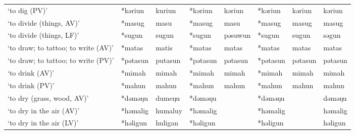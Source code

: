 \begin{landscape}
\begin{longtable}[c]{@{}p{3cm}<{\raggedright}p{2.75cm}<{\raggedright}p{2.75cm}<{\raggedright}p{2.75cm}<{\raggedright}p{2.75cm}<{\raggedright}p{2.75cm}<{\raggedright}p{2.75cm}<{\raggedright}p{2.75cm}<{\raggedright}@{}}
`to dig (PV)'                                        & *kəriun            & kuriun                         & *kəriun            & kəriun                     & *kəriun          & kəriun                   & kəriun                            \\
`to divide (things, AV)'                             & *masug             & masu                           & *masug             & masu                       & *masug           & masug                    & masug                             \\
`to divide (things, LF)'                             & *sugun             & sugun                          & *sugun             & pəsuwun                    & *sugun           & sugun                    & səgun                             \\
`to draw; to tattoo; to write (AV)'                  & *matas             & matis                          & *matas             & matas                      & *matas           & matas                    & matas                             \\
`to draw; to tattoo; to write (PV)'                  & *pətasun           & putasun                        & *pətasun           & pətasun                    & *pətasun         & pətasun                  & pətasun                           \\
`to drink (AV)'                                      & *mimah             & mimah                          & *mimah             & mimah                      & *mimah           & mimah                    & mimah                             \\
`to drink (PV)'                                      & *mahun             & mahun                          & *mahun             & mahun                      & *mahun           & mahun                    & mahun                             \\
`to dry (grass, wood, AV)'                           & *dəməŋu            & dumeŋu                         & *dəməŋu            &                            & *dəməŋu          &                          & dəməŋu                            \\
`to dry in the air (AV)'                             & *həmalig           & humaluy                        & *həmalig           &                            & *həmalig         &                          & həmalig                           \\
`to dry in the air (LV)'                             & *həligun           & huligan                        & *həligun           &                            & *həligun         &                          & həligun                           \\

\end{longtable}
\end{landscape}
